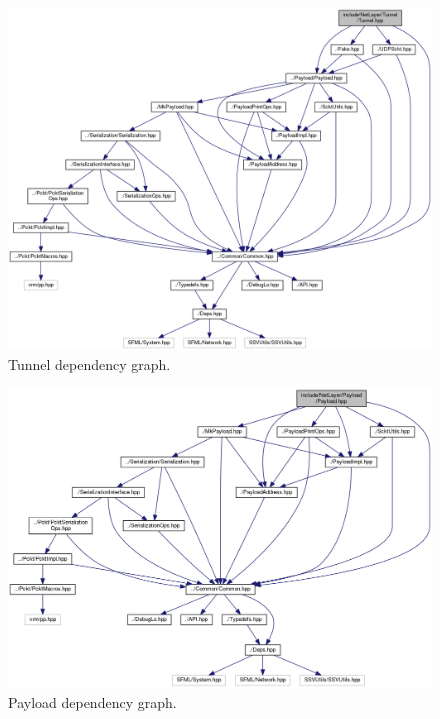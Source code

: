 \documentclass[11pt]{report}
\newcommand{\+}{\discretionary{\mbox{\scriptsize$\hookleftarrow$}}{}{}}
\begin{document}
    \begin{figure}[!htb]
    \caption{Tunnel dependency graph.}
    \centering
    \includegraphics[width=1\textwidth]{inc/dep_tunnel.png}
    \end{figure}

    \begin{figure}[!htb]
    \caption{Payload dependency graph.}
    \centering
    \includegraphics[width=1\textwidth]{inc/dep_paylod.png}
    \end{figure}
\end{document}
